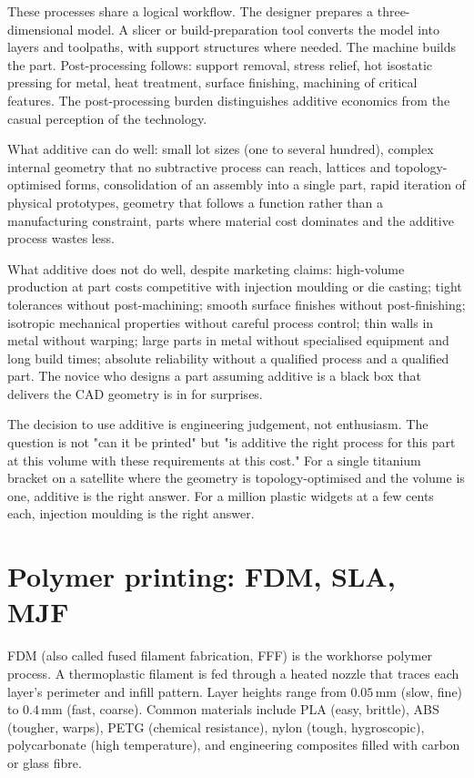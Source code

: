 These processes share a logical workflow. The designer prepares a three-dimensional model. A slicer or build-preparation tool converts the model into layers and toolpaths, with support structures where needed. The machine builds the part. Post-processing follows: support removal, stress relief, hot isostatic pressing for metal, heat treatment, surface finishing, machining of critical features. The post-processing burden distinguishes additive economics from the casual perception of the technology.

What additive can do well: small lot sizes (one to several hundred), complex internal geometry that no subtractive process can reach, lattices and topology-optimised forms, consolidation of an assembly into a single part, rapid iteration of physical prototypes, geometry that follows a function rather than a manufacturing constraint, parts where material cost dominates and the additive process wastes less.

What additive does not do well, despite marketing claims: high-volume production at part costs competitive with injection moulding or die casting; tight tolerances without post-machining; smooth surface finishes without post-finishing; isotropic mechanical properties without careful process control; thin walls in metal without warping; large parts in metal without specialised equipment and long build times; absolute reliability without a qualified process and a qualified part. The novice who designs a part assuming additive is a black box that delivers the CAD geometry is in for surprises.

The decision to use additive is engineering judgement, not enthusiasm. The question is not "can it be printed" but "is additive the right process for this part at this volume with these requirements at this cost." For a single titanium bracket on a satellite where the geometry is topology-optimised and the volume is one, additive is the right answer. For a million plastic widgets at a few cents each, injection moulding is the right answer.

\section{Polymer printing: FDM, SLA, MJF}

FDM (also called fused filament fabrication, FFF) is the workhorse polymer process. A thermoplastic filament is fed through a heated nozzle that traces each layer's perimeter and infill pattern. Layer heights range from $0.05\,\text{mm}$ (slow, fine) to $0.4\,\text{mm}$ (fast, coarse). Common materials include PLA (easy, brittle), ABS (tougher, warps), PETG (chemical resistance), nylon (tough, hygroscopic), polycarbonate (high temperature), and engineering composites filled with carbon or glass fibre.

